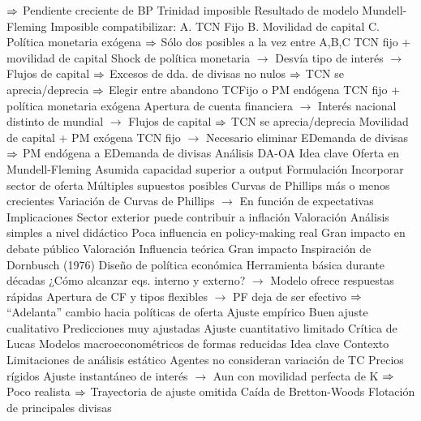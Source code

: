 \documentclass{nuevotema}
\begin{document}
\begin{esquemal}
				\4[] $\Rightarrow$ Pendiente creciente de BP
				\4[] 
			\3 Trinidad imposible
				\4 Resultado de modelo Mundell-Fleming
				\4[] Imposible compatibilizar:
				\4[] A. TCN Fijo
				\4[] B. Movilidad de capital
				\4[] C. Política monetaria exógena
				\4[] $\Rightarrow$ Sólo dos posibles a la vez entre A,B,C
				\4 TCN fijo + movilidad de capital
				\4[] Shock de política monetaria
				\4[] $\to$ Desvía tipo de interés
				\4[] $\to$ Flujos de capital
				\4[] $\Rightarrow$ Excesos de dda. de divisas no nulos
				\4[] $\Rightarrow$ TCN se aprecia/deprecia
				\4[] $\Rightarrow$ Elegir entre abandono TCFijo o PM endógena
				\4 TCN fijo + política monetaria exógena
				\4[] Apertura de cuenta financiera
				\4[] $\to$ Interés nacional distinto de mundial
				\4[] $\to$ Flujos de capital
				\4[] $\Rightarrow$ TCN se aprecia/deprecia
				\4 Movilidad de capital + PM exógena
				\4[] TCN fijo
				\4[] $\to$ Necesario eliminar EDemanda de divisas
				\4[] $\Rightarrow$ PM endógena a EDemanda de divisas
		\2 Análisis DA-OA
			\3 Idea clave
				\4 Oferta en Mundell-Fleming
				\4[] Asumida capacidad superior a output
				\4
			\3 Formulación
				\4 Incorporar sector de oferta
				\4 Múltiples supuestos posibles
				\4[] Curvas de Phillips más o menos crecientes
				\4[] Variación de Curvas de Phillips
				\4[] $\to$ En función de expectativas
			\3 Implicaciones
				\4 Sector exterior puede contribuir a inflación
			\3 Valoración
				\4 Análisis simples a nivel didáctico
				\4 Poca influencia en policy-making real
				\4 Gran impacto en debate público
		\2 Valoración
			\3 Influencia teórica
				\4 Gran impacto
				\4[] Inspiración de Dornbusch (1976)
				\4 Diseño de política económica
				\4[] Herramienta básica durante décadas
				\4[] ¿Cómo alcanzar eqs. interno y externo?
				\4[] $\to$ Modelo ofrece respuestas rápidas
				\4[] Apertura de CF y tipos flexibles
				\4[] $\to$ PF deja de ser efectivo
				\4[] $\Rightarrow$ ``Adelanta'' cambio hacia políticas de oferta
			\3 Ajuste empírico
				\4 Buen ajuste cualitativo
				\4[] Predicciones muy ajustadas
				\4 Ajuste cuantitativo limitado
				\4[] Crítica de Lucas
				\4[] Modelos macroeconométricos de formas reducidas
	\1 
		\2 Idea clave
			\3 Contexto
				\4 Limitaciones de análisis estático
				\4[] Agentes no consideran variación de TC
				\4[] Precios rígidos
				\4[] Ajuste instantáneo de interés
				\4[] $\to$ Aun con movilidad perfecta de K
				\4[] $\Rightarrow$ Poco realista
				\4[] $\Rightarrow$ Trayectoria de ajuste omitida
				\4 Caída de Bretton-Woods
				\4[] Flotación de principales divisas

\end{esquemal}
\end{document}

